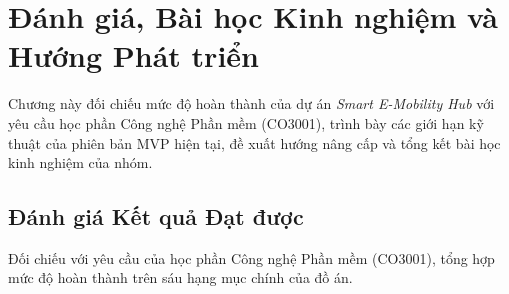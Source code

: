 \section{Đánh giá, Bài học Kinh nghiệm và Hướng Phát triển}

Chương này đối chiếu mức độ hoàn thành của dự án \textit{Smart E-Mobility Hub} với yêu cầu học phần Công nghệ Phần mềm (CO3001), trình bày các giới hạn kỹ thuật của phiên bản MVP hiện tại, đề xuất hướng nâng cấp và tổng kết bài học kinh nghiệm của nhóm.

\subsection{Đánh giá Kết quả Đạt được}

Đối chiếu với yêu cầu của học phần Công nghệ Phần mềm (CO3001),  tổng hợp mức độ hoàn thành trên sáu hạng mục chính của đồ án.

